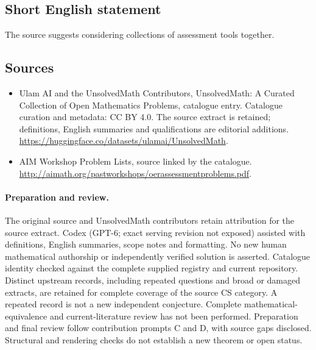 \documentclass[11pt]{article}
\begin{document}
\subsection{Short English statement}
The source suggests considering collections of assessment tools together.
\subsection{Sources}
\begin{itemize}
\item[\hypertarget{source:statement:1}{S1}] Ulam AI and the UnsolvedMath Contributors, UnsolvedMath: A Curated Collection of Open Mathematics Problems, catalogue entry. Catalogue curation and metadata: CC BY 4.0. The source extract is retained; definitions, English summaries and qualifications are editorial additions.
\url{https://huggingface.co/datasets/ulamai/UnsolvedMath}.
\item[\hypertarget{source:statement:2}{S2}] AIM Workshop Problem Lists, source linked by the catalogue.
\url{http://aimath.org/pastworkshops/oerassessmentproblems.pdf}.
\end{itemize}
\paragraph{Preparation and review.}
The original source and UnsolvedMath contributors retain attribution for the source extract. Codex (GPT-6; exact serving revision not exposed) assisted with definitions, English summaries, scope notes and formatting. No new human mathematical authorship or independently verified solution is asserted. Catalogue identity checked against the complete supplied registry and current repository. Distinct upstream records, including repeated questions and broad or damaged extracts, are retained for complete coverage of the source CS category. A repeated record is not a new independent conjecture. Complete mathematical-equivalence and current-literature review has not been performed. Preparation and final review follow contribution prompts C and D, with source gaps disclosed. Structural and rendering checks do not establish a new theorem or open status.
\label{end:statement}
\end{document}
